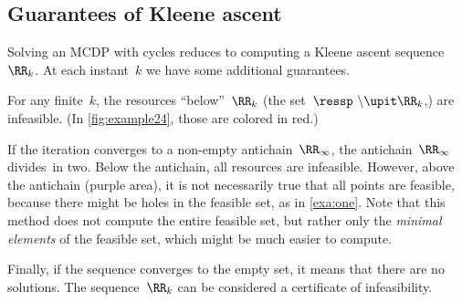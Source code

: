 \subsection{Guarantees of Kleene ascent}

Solving an MCDP with cycles reduces to computing a Kleene ascent sequence~$\RR_{k}$.
At each instant~$k$ we have some additional guarantees.

For any finite~$k$, the resources ``below''~$\RR_{k}$ (the set~$\ressp\ \backslash\upit\RR_{k}$,) are infeasible.
(In \cref{fig:example24}, those are colored in red.)

If the iteration converges to a non-empty antichain~$\RR_{\infty}$, the antichain~$\RR_{\infty}$ divides~\ressp in two.
Below the antichain, all resources are infeasible.
However, above the antichain (purple area), it is not necessarily true that all points are feasible, because there might be holes in the feasible set, as in \cref{exa:one}.
Note that this method does not compute the entire feasible set, but rather only the \emph{minimal elements} of the feasible set, which might be much easier to compute.

Finally, if the sequence converges to the empty set, it means that there are no solutions.
The sequence~$\RR_{k}$ can be considered a certificate of infeasibility.
